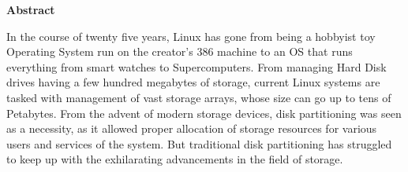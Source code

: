 
\begin{titlepage}
\begin{center}
\textbf{\LARGE{Abstract}}\\[1cm]
\end{center}
\normalsize

In the course of twenty five years, Linux has gone from being a hobbyist toy
Operating System run on the creator's 386 machine to an OS that runs everything
from smart watches to Supercomputers. From managing Hard Disk drives having a
few hundred megabytes of storage, current Linux systems are tasked with
management of vast storage arrays, whose size can go up to tens of Petabytes.
From the advent of modern storage devices, disk partitioning was seen as a
necessity, as it allowed proper allocation of storage resources for various
users and services of the system. But traditional disk partitioning has
struggled to keep up with the exhilarating advancements in the field of storage.


\end{titlepage}
